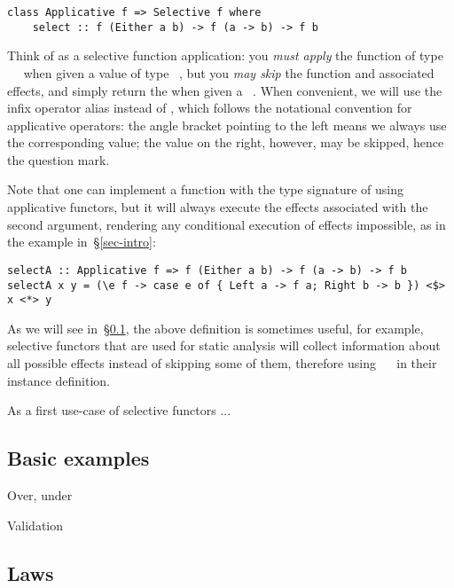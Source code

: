 \begin{verbatim}
class Applicative f => Selective f where
    select :: f (Either a b) -> f (a -> b) -> f b
\end{verbatim}

\noindent
Think of  as a selective function application: you \emph{must apply}
the function of type ~\hs{->}~ when given a value of type
~, but you \emph{may skip} the function and associated effects,
and simply return the  when given a ~. When convenient, we
will use the infix operator alias  instead of , which follows
the notational convention for applicative operators: the angle bracket pointing
to the left means we always use the corresponding value; the value on the right,
however, may be skipped, hence the question mark.

Note that one can implement a function with the type signature of 
using applicative functors, but it will always execute the effects associated
with the second argument, rendering any conditional execution of effects
impossible, as in the  example in~\S\ref{sec-intro}:

\begin{verbatim}
selectA :: Applicative f => f (Either a b) -> f (a -> b) -> f b
selectA x y = (\e f -> case e of { Left a -> f a; Right b -> b }) <$> x <*> y
\end{verbatim}

\noindent
As we will see in~\S\ref{sec-instances}, the above definition is sometimes
useful, for example, selective functors that are used for static analysis will
collect information about all possible effects instead of skipping some of them,
therefore using ~\hs{=}~ in their instance definition.


As a first use-case of selective functors ...



\subsection{Basic examples}\label{sec-instances}

Over, under

Validation

\subsection{Laws}\label{sec-laws}


